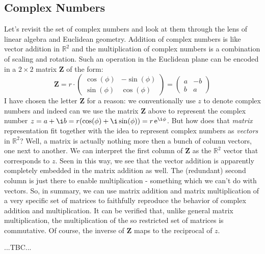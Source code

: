 \subsection{Complex Numbers}
Let's revisit the set of complex numbers and look at them through the lens of linear algebra and Euclidean geometry. Addition of complex numbers is like vector addition in $\mathbb{R}^2$ and the multiplication of complex numbers is a combination of scaling and rotation. Such an operation in the Euclidean plane can be encoded in a $2 \times 2$ matrix $\mathbf{Z}$ of the form:
\begin{equation}
 \mathbf{Z} 
 = r \cdot
 \begin{pmatrix}
 \cos(\phi) & -\sin(\phi) \\
 \sin(\phi) &  \cos(\phi)
 \end{pmatrix}
 =
 \begin{pmatrix}
  a & -b \\
 b  &  a
 \end{pmatrix} 
\end{equation}
I have chosen the letter $\mathbf{Z}$ for a reason: we conventionally use $z$ to denote complex numbers and indeed can we use the matrix $\mathbf{Z}$ above to represent the complex number $z = a + \i b = r(\cos(\phi) + \i \sin(\phi)) = r \e^{\i \phi}$. But how does that \emph{matrix} representation fit together with the idea to represent complex numbers as \emph{vectors} in $\mathbb{R}^2$? Well, a matrix is actually nothing more then a bunch of column vectors, one next to another. We can interpret the first column of $\mathbf{Z}$ as the $\mathbb{R}^2$ vector that corresponds to $z$. Seen in this way, we see that the vector addition is apparently completely embedded in the matrix addition as well. The (redundant) second column is just there to enable multiplication - something which we can't do with vectors. So, in summary, we can use matrix addition and matrix multiplication of a very specific set of matrices to faithfully reproduce the behavior of complex addition and multiplication. It can be verified that, unlike general matrix multiplication, the multiplication of the so restricted set of matrices is commutative. Of course, the inverse of $\mathbf{Z}$ maps to the reciprocal of $z$.

...TBC...




